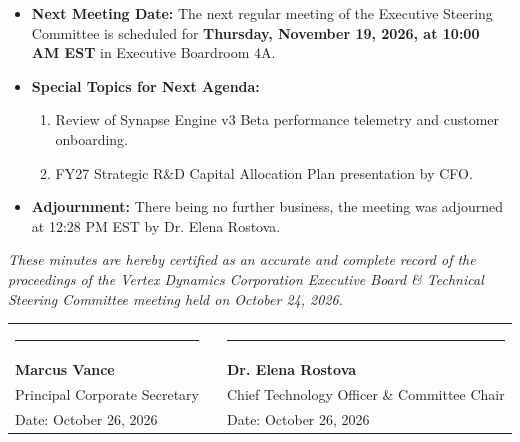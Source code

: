 \documentclass[11pt,a4paper]{article}
\begin{document}
\begin{itemize}[leftmargin=15pt, itemsep=3pt]
    \item \textbf{Next Meeting Date:} The next regular meeting of the Executive Steering Committee is scheduled for \textbf{Thursday, November 19, 2026, at 10:00 AM EST} in Executive Boardroom 4A.
    \item \textbf{Special Topics for Next Agenda:}
    \begin{enumerate}[label=\lbrack\arabic*\rbrack, leftmargin=18pt, itemsep=2pt]
        \item Review of Synapse Engine v3 Beta performance telemetry and customer onboarding.
        \item FY27 Strategic R\&D Capital Allocation Plan presentation by CFO.
    \end{enumerate}
    \item \textbf{Adjournment:} There being no further business, the meeting was adjourned at 12:28 PM EST by Dr. Elena Rostova.
\end{itemize}

\vspace{0.3cm}

\begin{tcolorbox}[
    enhanced,
    colback=SlateLight,
    colframe=BorderGray,
    arc=4pt,
    boxrule=0.8pt,
    title={\small\bfseries\faCheckSquare\ Minutes Authorization \& Approval},
    coltitle=NavyPrimary,
    top=8pt, bottom=8pt, left=12pt, right=12pt
]
    \small
    \textit{These minutes are hereby certified as an accurate and complete record of the proceedings of the Vertex Dynamics Corporation Executive Board \& Technical Steering Committee meeting held on October 24, 2026.}
    \vspace{0.6cm}

    \begin{tabularx}{\textwidth}{@{}X c X@{}}
        \rule{0.8\linewidth}{0.6pt} & \hspace{1cm} & \rule{0.8\linewidth}{0.6pt} \\
        \textbf{Marcus Vance} & & \textbf{Dr. Elena Rostova} \\
        Principal Corporate Secretary & & Chief Technology Officer \& Committee Chair \\
        Date: October 26, 2026 & & Date: October 26, 2026 \\
    \end{tabularx}
\end{tcolorbox}
\end{document}
